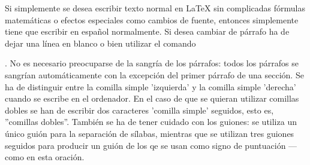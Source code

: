 \documentclass[a4paper,10pt]{letter}
\begin{document}
Si simplemente se desea escribir texto normal en LaTeX
sin complicadas fórmulas matemáticas o efectos especiales
como cambios de fuente, entonces simplemente tiene que escribir 
en español normalmente.
Si desea cambiar de párrafo ha de dejar una línea en blanco o bien
utilizar el comando \par.
No es necesario preocuparse de la sangría de los párrafos:
todos los párrafos se sangrían automáticamente con la excepción 
del primer párrafo de una sección.
Se ha de distinguir entre la comilla simple 'izquierda' 
y la comilla simple 'derecha' cuando se escribe en el ordenador.
En el caso de que se quieran utilizar comillas dobles se han de 
escribir dos caracteres 'comilla simple' seguidos, esto es,
''comillas dobles''.
También se ha de tener cuidado con los guiones: se utiliza un único
guión para la separación de sílabas, mientras que se utilizan 
tres guiones seguidos para producir un guión de los qe se usan 
como signo de puntuación --- como en esta oración.
\end{document}
